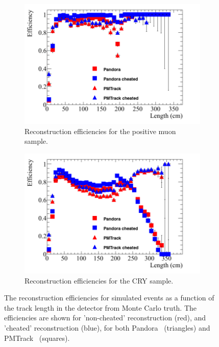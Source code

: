 \begin{figure}
  \centering
  \begin{subfigure}{0.48\textwidth}
    \centering
    \includegraphics[width=\textwidth]{Effic_AntiMuon_500V_All_Length}
    \caption{Reconstruction efficiencies for the positive muon sample.}
    \label{fig:SimEffic_Length_AMu}
  \end{subfigure}%
  \hspace{0.03\textwidth}%
  \begin{subfigure}{0.48\textwidth}
    \centering
    \includegraphics[width=\textwidth]{Effic_Cosmics_500V_All_Length}
    \caption{Reconstruction efficiencies for the CRY sample.}
    \label{fig:SimEffic_Length_CRY}
  \end{subfigure}
  \caption[The reconstruction efficiencies for simulated events as a function of the track length in the detector from Monte Carlo truth.]
          {The reconstruction efficiencies for simulated events as a function of the track length in the detector from Monte Carlo truth. The efficiencies are shown for 'non-cheated' reconstruction (red), and 'cheated' reconstruction (blue), for both Pandora~\citep{Pandora} (triangles) and PMTrack~\citep{PMTrack} (squares).}
          \label{fig:SimEffic_Length}
\end{figure}

